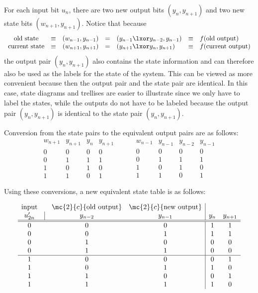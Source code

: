 For each input bit $u_n$, there are two new output bits $(y_n, y_{n+1})$
and two new state bits $(w_{n+1}, y_{n+1})$.
Notice that because  
\[
\begin{array}{clrclcl}
   \mbox{old state}     &\equiv& (w_{n-1}, y_{n-1}) &=& (y_{n-1}\lxor y_{n-2}, y_{n-1}) &\equiv& f(\mbox{old output}) \\
   \mbox{current state} &\equiv& (w_{n+1}, y_{n+1}) &=& (y_{n+1}\lxor y_n, y_{n+1})     &\equiv& f(\mbox{current output})
\end{array}
\]
the output pair $(y_n, y_{n+1})$ also contains the state information 
and can therefore also be used as the labels for the state of the system.
This can be viewed as more convenient because then the output pair and
the state pair are identical.
In this case, state diagrams and trellises are easier to 
illustrate since we only have to label the states, 
while the outputs do not have to be labeled because the
output pair $(y_n, y_{n+1})$ is identical to the state pair $(y_n, y_{n+1})$.

Conversion from the state pairs to the equivalent output pairs are as follows:
\[
\begin{array}{cc|cc}
   w_{n+1} & y_{n+1} & y_n & y_{n+1} \\
   \hline
   0 & 0 & 0 & 0 \\
   0 & 1 & 1 & 1 \\
   1 & 0 & 1 & 0 \\
   1 & 1 & 0 & 1   
\end{array}
\hspace{1cm}
\begin{array}{cc|cc}
   w_{n-1} & y_{n-1} & y_{n-2} & y_{n-1} \\
   \hline
   0 & 0 & 0 & 0 \\
   0 & 1 & 1 & 1 \\
   1 & 0 & 1 & 0 \\
   1 & 1 & 0 & 1   
\end{array}
\]

Using these conversions, a new equivalent state table is as follows:

\[
\begin{array}{cccc|cccc}
   \mbox{input} &      & \mc{2}{c}{\mbox{old output}} & \mc{2}{c}{\mbox{new output}} \\
   u_{2n}'      &\vline& y_{n-2} & y_{n-1}     & y_n & y_{n+1} \\
   \hline
   \hline
   0 && 0 & 0    & 1 & 1  \\
   0 && 0 & 1    & 1 & 1  \\
   0 && 1 & 0    & 0 & 0  \\
   0 && 1 & 1    & 0 & 0  \\
   \hline
   1 && 0 & 0    & 0 & 1  \\
   1 && 0 & 1    & 1 & 0  \\
   1 && 1 & 0    & 0 & 1  \\
   1 && 1 & 1    & 1 & 0  
\end{array}
\]


